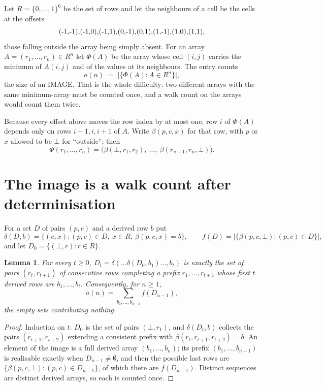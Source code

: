 \documentclass[11pt,a4paper]{article}
\theoremstyle{plain}
\newtheorem{lemma}[theorem]{Lemma}
\theoremstyle{definition}
\begin{document}
Let $R=\{0,\dots,1\}^{6}$ be the set of rows and let the neighbours of
a cell be the cells at the offsets
\[
$(-1,-1)$, $(-1,0)$, $(-1,1)$, $(0,-1)$, $(0,1)$, $(1,-1)$, $(1,0)$, $(1,1)$,
\]
those falling outside the array being simply absent. For an array
$A=(r_1,\dots,r_n)\in R^n$ let $\Phi(A)$ be the array whose cell $(i,j)$ carries the
minimum of $A(i,j)$ and of the values at its neighbours. The entry counts
\[
a(n)\;=\;\bigl|\{\Phi(A):A\in R^n\}\bigr| ,
\]
the size of an IMAGE. That is the whole difficulty: two different arrays with the same
minimum-array must be counted once, and a walk count on the arrays would count them twice.

Because every offset above moves the row index by at most one, row $i$ of
$\Phi(A)$ depends only on rows $i-1,i,i+1$ of $A$. Write $\beta(p,c,x)$ for that row, with $p$
or $x$ allowed to be $\bot$ for ``outside''; then
\[
\Phi(r_1,\dots,r_n)=\bigl(\beta(\bot,r_1,r_2),\ \dots,\ \beta(r_{n-1},r_n,\bot)\bigr).
\]

\section{The image is a walk count after determinisation}

For a set $D$ of pairs $(p,c)$ and a derived row $b$ put
\[
\delta(D,b)=\{(c,x):(p,c)\in D,\ x\in R,\ \beta(p,c,x)=b\},\qquad
f(D)=\bigl|\{\beta(p,c,\bot):(p,c)\in D\}\bigr| ,
\]
and let $D_0=\{(\bot,r):r\in R\}$.

\begin{lemma}\label{lem:det}
For every $t\ge0$, $D_t=\delta(\dots\delta(D_0,b_1)\dots,b_t)$ is exactly the set of pairs
$(r_t,r_{t+1})$ of consecutive rows completing a prefix $r_1,\dots,r_{t+1}$ whose first $t$
derived rows are $b_1,\dots,b_t$. Consequently, for $n\ge1$,
\[
a(n)=\sum_{b_1,\dots,b_{n-1}}f(D_{n-1}),
\]
the empty sets contributing nothing.
\end{lemma}

\begin{proof}
Induction on $t$: $D_0$ is the set of pairs $(\bot,r_1)$, and $\delta(D_t,b)$ collects the
pairs $(r_{t+1},r_{t+2})$ extending a consistent prefix with
$\beta(r_t,r_{t+1},r_{t+2})=b$. An element of the image is a full derived array
$(b_1,\dots,b_n)$; its prefix $(b_1,\dots,b_{n-1})$ is realisable exactly when
$D_{n-1}\neq\emptyset$, and then the possible last rows are
$\{\beta(p,c,\bot):(p,c)\in D_{n-1}\}$, of which there are $f(D_{n-1})$. Distinct sequences
are distinct derived arrays, so each is counted once.
\end{proof}
\end{document}
